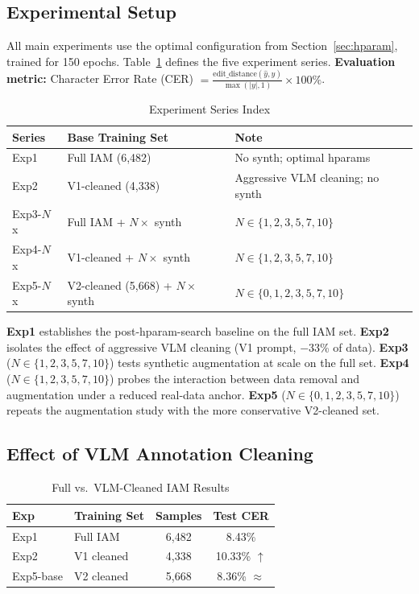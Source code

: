 \documentclass[conference]{IEEEtran}
\begin{document}
\subsection{Experimental Setup}

All main experiments use the optimal configuration from Section~\ref{sec:hparam}, trained for 150 epochs. Table~\ref{tab:exp_index} defines the five experiment series. \textbf{Evaluation metric:} Character Error Rate (CER) $= \frac{\text{edit\_distance}(\hat{y}, y)}{\max(|y|, 1)} \times 100\%$.

\begin{table}[h]
\centering
\caption{Experiment Series Index}
\label{tab:exp_index}
\begin{tabular}{@{}lll@{}}
\toprule
\textbf{Series} & \textbf{Base Training Set} & \textbf{Note} \\
\midrule
Exp1      & Full IAM (6,482)    & No synth; optimal hparams \\
Exp2      & V1-cleaned (4,338)  & Aggressive VLM cleaning; no synth \\
Exp3-$N$x & Full IAM + $N\times$ synth & $N \in \{1,2,3,5,7,10\}$ \\
Exp4-$N$x & V1-cleaned + $N\times$ synth & $N \in \{1,2,3,5,7,10\}$ \\
Exp5-$N$x & V2-cleaned (5,668) + $N\times$ synth & $N \in \{0,1,2,3,5,7,10\}$ \\
\bottomrule
\end{tabular}
\end{table}

\textbf{Exp1} establishes the post-hparam-search baseline on the full IAM set. \textbf{Exp2} isolates the effect of aggressive VLM cleaning (V1 prompt, $-$33\% of data). \textbf{Exp3} ($N\!\in\!\{1,2,3,5,7,10\}$) tests synthetic augmentation at scale on the full set. \textbf{Exp4} ($N\!\in\!\{1,2,3,5,7,10\}$) probes the interaction between data removal and augmentation under a reduced real-data anchor. \textbf{Exp5} ($N\!\in\!\{0,1,2,3,5,7,10\}$) repeats the augmentation study with the more conservative V2-cleaned set.

\subsection{Effect of VLM Annotation Cleaning}
\label{sec:cleaning}

\begin{table}[h]
\centering
\caption{Full vs.\ VLM-Cleaned IAM Results}
\label{tab:cleaning}
\begin{tabular}{@{}llcc@{}}
\toprule
\textbf{Exp} & \textbf{Training Set} & \textbf{Samples} & \textbf{Test CER} \\
\midrule
Exp1          & Full IAM       & 6,482 & 8.43\% \\
Exp2          & V1 cleaned     & 4,338 & 10.33\% $\uparrow$ \\
Exp5-base     & V2 cleaned     & 5,668 & 8.36\% $\approx$ \\
\bottomrule
\end{tabular}
\end{table}
\end{document}
